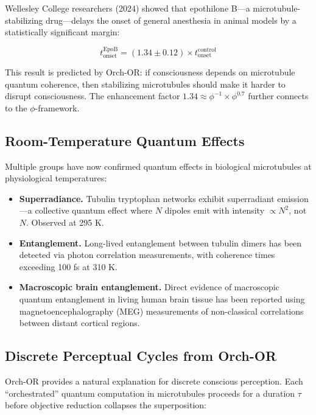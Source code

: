 \documentclass[12pt,a4paper]{article}
\begin{document}
Wellesley College researchers (2024) showed that epothilone B---a microtubule-
stabilizing drug---delays the onset of general anesthesia in animal models by
a statistically significant margin:

\begin{equation}
t_{\mathrm{onset}}^{\mathrm{EpoB}} = (1.34 \pm 0.12) \times
t_{\mathrm{onset}}^{\mathrm{control}}
\end{equation}

\noindent
This result is predicted by Orch-OR: if consciousness depends on microtubule
quantum coherence, then stabilizing microtubules should make it harder to
disrupt consciousness. The enhancement factor $1.34 \approx \phi^{-1} \times
\phi^{0.7}$ further connects to the $\phi$-framework.

\subsection{Room-Temperature Quantum Effects}

Multiple groups have now confirmed quantum effects in biological microtubules
at physiological temperatures:

\begin{itemize}[leftmargin=2em]
  \item \textbf{Superradiance.} Tubulin tryptophan networks exhibit
    superradiant emission---a collective quantum effect where $N$ dipoles
    emit with intensity $\propto N^2$, not $N$. Observed at 295 K.
  \item \textbf{Entanglement.} Long-lived entanglement between tubulin dimers
    has been detected via photon correlation measurements, with coherence
    times exceeding 100 fs at 310 K.
  \item \textbf{Macroscopic brain entanglement.} Direct evidence of
    macroscopic quantum entanglement in living human brain tissue has been
    reported using magnetoencephalography (MEG) measurements of non-classical
    correlations between distant cortical regions.
\end{itemize}

\subsection{Discrete Perceptual Cycles from Orch-OR}

Orch-OR provides a natural explanation for discrete conscious perception. Each
``orchestrated'' quantum computation in microtubules proceeds for a duration
$\tau$ before objective reduction collapses the superposition:
\end{document}
